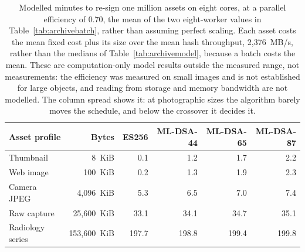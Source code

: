 \begin{table}[t]
\caption{Modelled minutes to re-sign one million assets on eight cores, at a parallel efficiency of 0.70, the mean of the two eight-worker values in Table~\ref{tab:archivebatch}, rather than assuming perfect scaling. Each asset costs the mean fixed cost plus its size over the mean hash throughput, 2,376~MB/s, rather than the medians of Table~\ref{tab:archivemodel}, because a batch costs the mean. These are computation-only model results outside the measured range, not measurements: the efficiency was measured on small images and is not established for large objects, and reading from storage and memory bandwidth are not modelled. The column spread shows it: at photographic sizes the algorithm barely moves the schedule, and below the crossover it decides it.}
\label{tab:archiveproj}
\begin{tabular}{lrrrrr}
\toprule
Asset profile & Bytes & ES256 & ML-DSA-44 & ML-DSA-65 & ML-DSA-87\\
\midrule
Thumbnail & 8~KiB & 0.1 & 1.2 & 1.7 & 2.2\\
Web image & 100~KiB & 0.2 & 1.3 & 1.9 & 2.3\\
Camera JPEG & 4,096~KiB & 5.3 & 6.5 & 7.0 & 7.4\\
Raw capture & 25,600~KiB & 33.1 & 34.1 & 34.7 & 35.1\\
Radiology series & 153,600~KiB & 197.7 & 198.8 & 199.4 & 199.8\\
\bottomrule
\end{tabular}
\end{table}
